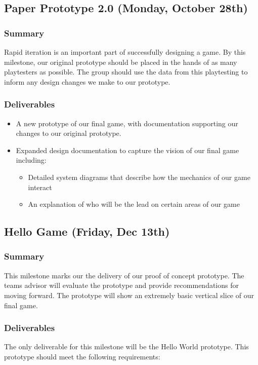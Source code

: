 \subsection{Paper Prototype 2.0 (Monday, October 28th)}

\subsubsection*{Summary}
Rapid iteration is an important part of successfully designing a game. By this
milestone, our original prototype should be placed in the hands of as many
playtesters as possible. The group should use the data from this playtesting to
inform any design changes we make to our prototype.

\subsubsection*{Deliverables}
\begin{itemize}
  \item A new prototype of our final game, with documentation supporting our
  changes to our original prototype.
  \item Expanded design documentation to capture the vision of our final game
  including:
  \begin{itemize}
    \item Detailed system diagrams that describe how the mechanics of our game
    interact
    \item An explanation of who will be the lead on certain areas of our game
  \end{itemize}
\end{itemize}

\subsection{Hello Game (Friday, Dec 13th)}

\subsubsection*{Summary}
This milestone marks our the delivery of our proof of concept prototype. The teams advisor will evaluate the prototype and provide recommendations for moving forward. The prototype will show an extremely basic vertical slice of our final game. 

\subsubsection*{Deliverables}
The only deliverable for this milestone will be the Hello World prototype. This prototype should meet the following requirements:

